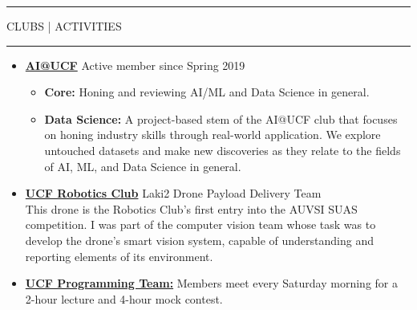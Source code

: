\documentclass{article}
\newcommand{\makesection}[1]{\hrule\vskip1mm\uppercase{#1}\vskip1mm\hrule}
\begin{document}
\makesection{Clubs | Activities}
\begin{itemize}[leftmargin=.35cm]

    \item \textbf{\href{https://ucfai.org}{AI@UCF}} Active member since Spring 2019
    \vspace*{-1.5mm}
    \raggedright
    \begin{itemize}[$\circ$]
        \item \textbf{Core:} Honing and reviewing AI/ML and Data Science in general.
        \item \textbf{Data Science:} A project-based stem of the AI@UCF club that focuses on honing industry skills through real-world application. We explore untouched datasets and make new discoveries as they relate to the fields of AI, ML, and Data Science in general.
    \end{itemize}

    \item \textbf{\href{https://robotics.ucf.edu/projects/2019}{UCF Robotics Club}} Laki2 Drone Payload Delivery Team \\
    This drone is the Robotics Club's first entry into the AUVSI SUAS competition. I was part of the computer vision team whose task was to develop the drone's smart vision system, capable of understanding and reporting elements of its environment.

    \item \textbf{\href{https://www.ucfprogrammingteam.org}{UCF Programming Team:}} Members meet every Saturday morning for a 2-hour lecture and 4-hour mock contest.
\end{itemize}
\end{document}
